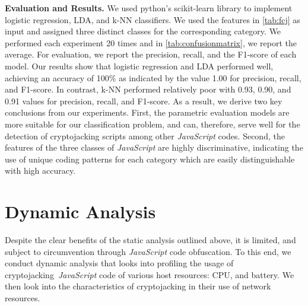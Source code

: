 \documentclass[acmlarge]{acmart}
\newcommand{\BfPara}[1]{{\noindent\bf#1.}\xspace\xspace}
\newcommand{\js}{{\em JavaScript}\xspace}
\newcommand{\cj}{cryptojacking\xspace}
\begin{document}
{\BfPara{Evaluation and Results} We used python's scikit-learn library to implement logistic regression, LDA, and k-NN classifiers. We used the features in \autoref{tab:fcj} as input and assigned three distinct classes for the corresponding category. We performed each experiment 20 times and in \autoref{tab:confusionmatrix}, we report the average. For evaluation, we report the precision, recall, and the F1-score of each model. Our results show that logistic regression and LDA performed well, achieving an accuracy of 100\% as indicated by the value 1.00 for precision, recall, and F1-score. In contrast, k-NN performed relatively poor with 0.93, 0.90, and 0.91 values for precision, recall, and F1-score. As a result, we derive two key conclusions from our experiments. First, the parametric evaluation models are more suitable for our classification problem, and can, therefore, serve well for the detection of \cj scripts among other \js codes. Second, the features of the three classes of \js are highly discriminative, indicating the use of unique coding patterns for each category which are easily distinguishable with high accuracy.} 





\section{Dynamic Analysis} \label{sec:dynamic}
Despite the clear benefits of the static analysis outlined above, it is limited, and subject to circumvention through \js code obfuscation. To this end, we conduct dynamic analysis that looks into profiling the usage of \cj~\js code of various host resources: CPU, and battery. We then look into the characteristics of \cj in their use of network resources.

%
\end{document}
